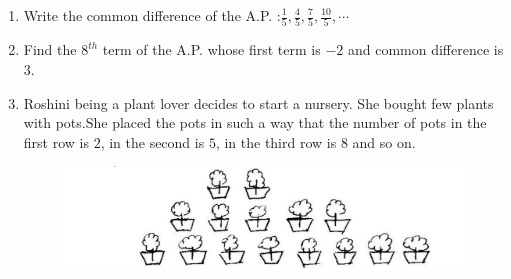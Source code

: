 \documentclass[10pt]{article}
\begin{document}
\begin{enumerate}
	\item Write the common difference of the A.P. :\( \frac{1}{5},\frac{4}{5},\frac{7}{5},\frac{10}{5},\cdots \)

	\item Find the $8^{th}$ term of the A.P. whose first term is $-2$ and common difference is $3$.
	\item
	Roshini being a plant lover decides to start a nursery. She bought few plants with pots.She placed the pots in such a way that the number of pots in the first row is $2$, in the second is $5$, in the third row is $8$ and so on.
		\begin{figure}[h]
			\centering	
			\includegraphics[width=\columnwidth]{figs/Plant.png}
			\label{fig:plant}
		\end{figure}
	

\end{enumerate}
\end{document}
